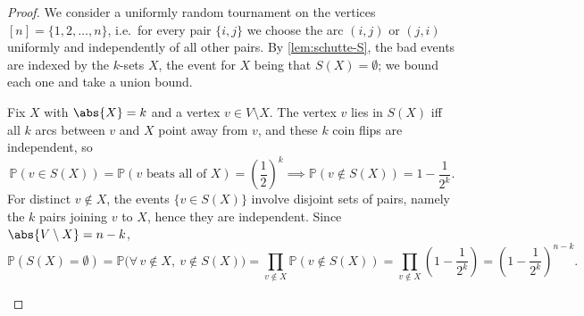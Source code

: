 \begin{proof}
    We consider a uniformly random tournament on the vertices \([n] = \{1, 2, \ldots, n\}\), i.e.\ for every pair \(\{i, j\}\) we choose the arc \((i, j)\) or \((j, i)\) uniformly and independently of all other pairs. By \autoref{lem:schutte-S}, the bad events are indexed by the \(k\)-sets \(X\), the event for \(X\) being that \(S(X) = \emptyset\); we bound each one and take a union bound.

    Fix \(X\) with \(\abs{X} = k\) and a vertex \(v \in V \setminus X\). The vertex \(v\) lies in \(S(X)\) iff all \(k\) arcs between \(v\) and \(X\) point away from \(v\), and these \(k\) coin flips are independent, so
    \[
        \mathbb{P}(v \in S(X)) = \mathbb{P}(v \text{ beats all of } X) = \left( \frac{1}{2} \right)^{k}
        \implies \mathbb{P}(v \notin S(X)) = 1 - \frac{1}{2^k}.
    \]
    For distinct \(v \notin X\), the events \(\{v \in S(X)\}\) involve disjoint sets of pairs, namely the \(k\) pairs joining \(v\) to \(X\), hence they are independent. Since \(\abs{V \setminus X} = n - k\),
    \[
        \mathbb{P}(S(X) = \emptyset)
        = \mathbb{P}\bigl( \forall\, v \notin X,\ v \notin S(X) \bigr)
        = \prod_{v \notin X} \mathbb{P}(v \notin S(X))
        = \prod_{v \notin X} \left( 1 - \frac{1}{2^k} \right)
        = \left( 1 - \frac{1}{2^k} \right)^{n-k}.
    \]
    \begin{center}
\end{center}
\end{proof}
